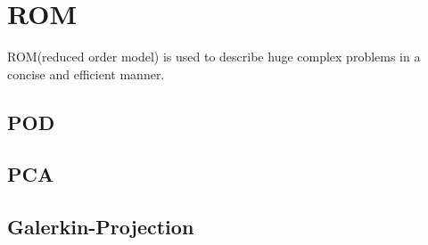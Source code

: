 
\chapter{ROM}
ROM(reduced order model) is used to describe huge complex problems in a concise and efficient manner.  


\section{POD}

\section{PCA}

\section{Galerkin-Projection}

  
  

  
  
  
